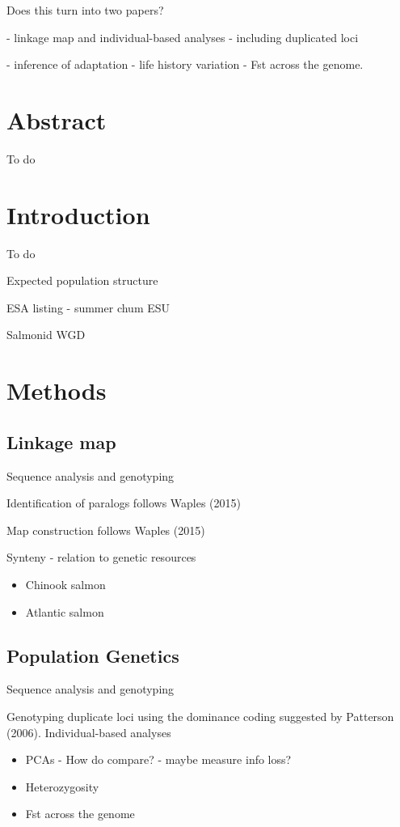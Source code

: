 \documentclass[12pt,  one column]{article}
\begin{document}
Does this turn into two papers?

 - linkage map and individual-based analyses - including duplicated loci

 - inference of adaptation - life history variation  - Fst across the genome.  
 

\section*{Abstract}
To do

\section*{Introduction}
To do

Expected population structure

ESA listing - summer chum ESU

Salmonid WGD

\section*{Methods}

\subsection*{Linkage map}

Sequence analysis and genotyping

Identification of paralogs follows Waples (2015)

Map construction follows Waples (2015)

Synteny - relation to genetic resources
\begin{itemize}
	\item Chinook salmon
    \item Atlantic salmon
\end{itemize}

\subsection*{Population Genetics}
Sequence analysis and genotyping

Genotyping duplicate loci using the dominance coding suggested by Patterson (2006). 
Individual-based analyses
\begin{itemize}
	\item PCAs - How do compare? - maybe measure info loss?
    \item Heterozygosity
	\item Fst across the genome
\end{itemize}
\end{document}
